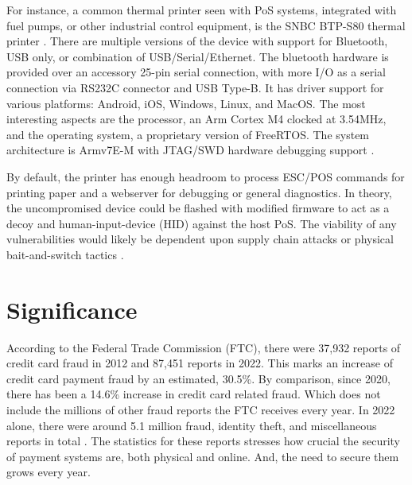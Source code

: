 For instance, a common thermal printer seen with PoS systems, integrated with fuel pumps, or other industrial control equipment, is the SNBC BTP-S80 thermal printer \autocite{SNBCBTPS80Thermala,SNBCNewBeiyangIntelligent}. There are multiple versions of the device with support for Bluetooth, USB only, or combination of USB/Serial/Ethernet. The bluetooth hardware is provided over an accessory 25-pin serial connection, with more I/O as a serial connection via RS232C connector and USB Type-B. It has driver support for various platforms: Android, iOS, Windows, Linux, and MacOS. The most interesting aspects are the processor, an Arm Cortex M4 clocked at 3.54MHz, and the operating system, a proprietary version of FreeRTOS. The system architecture is Armv7E-M with JTAG/SWD hardware debugging support \autocite{CortexM4,FreeRTOSMarketLeading}.

By default, the printer has enough headroom to process ESC/POS commands for printing paper and a webserver for debugging or general diagnostics. In theory, the uncompromised device could be flashed with modified firmware to act as a decoy and human-input-device (HID) against the host PoS. The viability of any vulnerabilities would likely be dependent upon supply chain attacks or physical bait-and-switch tactics \autocite{scaifeFearReaperCharacterization2018}.


\section{Significance}  \label{significance}

According to the Federal Trade Commission (FTC), there were 37,932 reports of credit card fraud in 2012 and 87,451 reports in 2022. This marks an increase of credit card payment fraud by an estimated, 30.5\%. By comparison, since 2020, there has been a 14.6\% increase in credit card related fraud. Which does not include the millions of other fraud reports the FTC receives every year. In 2022 alone, there were around 5.1 million fraud, identity theft, and miscellaneous reports in total \autocite{ConsumerSentinelNetwork2023,forthesentinelConsumerSentinelNetwork2022}. The statistics for these reports stresses how crucial the security of payment systems are, both physical and online. And, the need to secure them grows every year.

